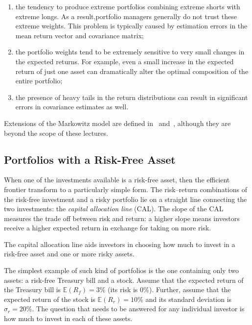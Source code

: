 \begin{enumerate}
\tightlist
\item the tendency to produce extreme portfolios combining extreme shorts with extreme longs. As a result,portfolio managers generally do not trust these extreme weights. This problem is typically caused by
estimation errors in the mean return vector and covariance matrix;
\item the portfolio weights tend to be extremely sensitive to very small changes in the expected returns. For example, even a small increase in the expected return of just one asset can dramatically alter the optimal composition of the entire portfolio;
\item the presence of heavy tails in the return distributions can result in significant errors in covariance estimates as well.
\end{enumerate}

Extensions of the Markowitz model are defined in~\cite{bib:post_modern_theory} and~\cite{bib:black_litterman}, although they are beyond the scope of these lectures. 
    
\subsection{Portfolios with a Risk-Free Asset}
\label{portfolios-with-a-risk-free-asset}

When one of the investments available is a risk-free asset, then the efficient frontier transform to a particularly simple form. The risk–return combinations of the risk-free investment and a risky portfolio lie on a straight line connecting the two investments: the \emph{capital allocation line} (CAL). The slope of the CAL measures the trade off between risk and return: a higher slope means investors receive a higher expected return in exchange for taking on more risk.

The capital allocation line aids investors in choosing how much to invest in a risk-free asset and one or more risky assets.

The simplest example of such kind of portfolios is the one containing only two assets: a risk-free Treasury bill and a stock. Assume that the expected return of the Treasury bill is \(\mathbb{E}(R_f)=3\%\) (its risk is 0\%). Further, assume that the expected return of the stock is \(\mathbb{E}(R_r)=10\%\) and its standard deviation is \(\sigma_r=20\%\). The question that needs to be answered for any individual investor is how much to invest in each of these assets.

